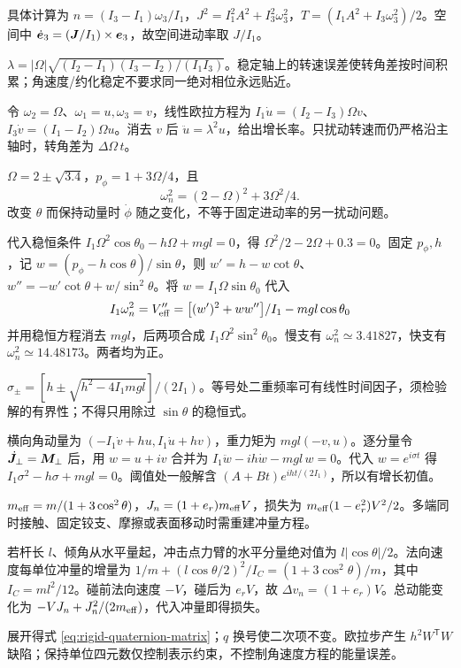 \begin{bookexercises}
具体计算为 $n=(I_3-I_1)\omega_3/I_1$，$J^2=I_1^2 A^2+I_3^2\omega_3^2$，$T=(I_1 A^2+I_3\omega_3^2)/2$。空间中 $\dot{\boldsymbol{e}}_3=(\boldsymbol{J}/I_1)\times\boldsymbol{e}_3$，故空间进动率取 $J/I_1$。
\item $\lambda=|\Omega|\sqrt{(I_2-I_1)(I_3-I_2)/(I_1I_3)}$。稳定轴上的转速误差使转角差按时间积累；角速度/约化稳定不要求同一绝对相位永远贴近。

令 $\omega_2=\Omega$、$\omega_1=u,\omega_3=v$，线性欧拉方程为 $I_1\dot u=(I_2-I_3)\Omega v$、$I_3\dot v=(I_1-I_2)\Omega u$。消去 $v$ 后 $\ddot u=\lambda^2u$，给出增长率。只扰动转速而仍严格沿主轴时，转角差为 $\Delta\Omega\,t$。
\item $\Omega=2\pm\sqrt{3.4}$，$p_\phi=1+3\Omega/4$，且
\[\omega_n^2=(2-\Omega)^2+3\Omega^2/4.\]
改变 $\theta$ 而保持动量时 $\dot\phi$ 随之变化，不等于固定进动率的另一扰动问题。

代入稳恒条件 $I_1\Omega^2\cos\theta_0-h\Omega+mgl=0$，得 $\Omega^2/2-2\Omega+0.3=0$。固定 $p_\phi,h$，记 $w=(p_\phi-h\cos\theta)/\sin\theta$，则 $w'=h-w\cot\theta$、$w''=-w'\cot\theta+w/\sin^2\theta$。将 $w=I_1\Omega\sin\theta_0$ 代入
\[
I_1\omega_n^2=V_{\rm eff}''=\big[(w')^2+ww''\big]/I_1-mgl\cos\theta_0
\]
并用稳恒方程消去 $mgl$，后两项合成 $I_1\Omega^2\sin^2\theta_0$。慢支有 $\omega_n^2\simeq3.41827$，快支有 $\omega_n^2\simeq14.48173$。两者均为正。
\item $\sigma_\pm=[h\pm\sqrt{h^2-4I_1mgl}]/(2I_1)$。等号处二重频率可有线性时间因子，须检验解的有界性；不得只用除过 $\sin\theta$ 的稳恒式。

横向角动量为 $(-I_1\dot v+hu,I_1\dot u+hv)$，重力矩为 $mgl(-v,u)$。逐分量令 $\dot{\boldsymbol{J}}_\perp=\boldsymbol{M}_\perp$ 后，用 $w=u+iv$ 合并为 $I_1\ddot w-ih\dot w-mgl\,w=0$。代入 $w=e^{i\sigma t}$ 得 $I_1\sigma^2-h\sigma+mgl=0$。阈值处一般解含 $(A+Bt)e^{iht/(2I_1)}$，所以有增长初值。
\item $m_{\rm eff}=m/(1+3\cos^2\theta)$，$J_n=(1+e_r)m_{\rm eff}V$，损失为 $m_{\rm eff}(1-e_r^2)V^2/2$。多端同时接触、固定铰支、摩擦或表面移动时需重建冲量方程。

若杆长 $l$、倾角从水平量起，冲击点力臂的水平分量绝对值为 $l|\cos\theta|/2$。法向速度每单位冲量的增量为 $1/m+(l\cos\theta/2)^2/I_C=(1+3\cos^2\theta)/m$，其中 $I_C=ml^2/12$。碰前法向速度 $-V$，碰后为 $e_r V$，故 $\Delta v_n=(1+e_r)V$。总动能变化为 $-VJ_n+J_n^2/(2m_{\rm eff})$，代入冲量即得损失。
\item 展开得式 \eqref{eq:rigid-quaternion-matrix}；$q$ 换号使二次项不变。欧拉步产生 $h^2W^{\mathsf T}W$ 缺陷；保持单位四元数仅控制表示约束，不控制角速度方程的能量误差。


\end{bookexercises}
